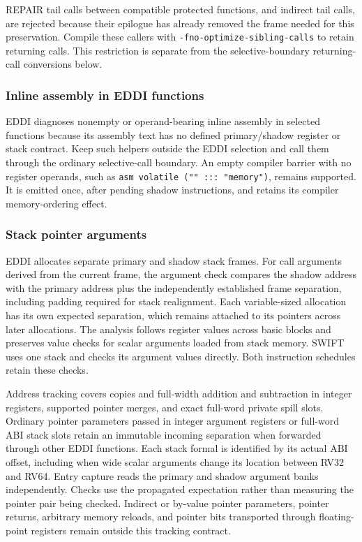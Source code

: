 REPAIR tail calls between compatible protected functions, and indirect tail
calls, are rejected because their epilogue has already removed the frame needed
for this preservation.
Compile these callers with
\texttt{-fno-optimize-sibling-calls} to retain returning calls. This restriction
is separate from the selective-boundary returning-call conversions below.

\subsubsection{Inline assembly in EDDI functions}
EDDI diagnoses nonempty or operand-bearing inline assembly in selected functions
because its assembly text has no defined primary/shadow register or stack
contract. Keep such helpers outside the EDDI selection and call them through
the ordinary selective-call boundary. An empty compiler barrier with no
register operands, such as \texttt{asm volatile ("" ::: "memory")}, remains
supported. It is emitted once, after pending shadow instructions, and retains
its compiler memory-ordering effect.

\subsubsection{Stack pointer arguments}
EDDI allocates separate primary and shadow stack frames. For call arguments
derived from the current frame, the argument check compares the shadow address
with the primary address plus the independently established frame separation,
including padding required for stack realignment. Each variable-sized allocation
has its own expected separation, which remains attached to its pointers across
later allocations. The analysis follows register values across basic blocks and
preserves value checks for scalar arguments loaded from stack memory. SWIFT uses
one stack and checks its argument values directly. Both instruction schedules
retain these checks.

Address tracking covers copies and full-width addition and subtraction in integer
registers, supported pointer merges, and exact full-word private spill slots.
Ordinary pointer parameters passed in integer argument registers or full-word
ABI stack slots retain an immutable incoming separation when forwarded through
other EDDI functions. Each stack formal is identified by its actual ABI offset,
including when wide scalar arguments change its location between RV32 and RV64.
Entry capture reads the primary and shadow argument banks independently.
Checks use the propagated expectation rather than measuring the pointer pair
being checked. Indirect or by-value pointer parameters,
pointer returns, arbitrary memory reloads, and pointer bits transported
through floating-point registers remain outside this tracking contract.

